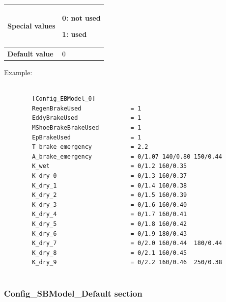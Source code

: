 \begin{itemize}
\begin{longtable}{|l|l|}
			\hline
			
			\begin{minipage}[t]{0.22\linewidth} \textbf{Special values}	\end{minipage}
			&	\begin{minipage}[t]{0.78\linewidth} 0: not used \item 1: used \end{minipage} \\
			
			\hline
			
			\begin{minipage}[t]{0.22\linewidth} \textbf{Default value}	\end{minipage}
			&	\begin{minipage}[t]{0.78\linewidth} 0 \end{minipage} \\
			
			\hline
		\end{longtable}
		
		Example:
		
		\begin{lstlisting}
		
		[Config_EBModel_0]
		RegenBrakeUsed              = 1
		EddyBrakeUsed               = 1
		MShoeBrakeBrakeUsed         = 1
		EpBrakeUsed                 = 1
		T_brake_emergency           = 2.2
		A_brake_emergency           = 0/1.07 140/0.80 150/0.44
		K_wet                       = 0/1.2	160/0.35
		K_dry_0                     = 0/1.3	160/0.37
		K_dry_1                     = 0/1.4	160/0.38
		K_dry_2                     = 0/1.5	160/0.39
		K_dry_3                     = 0/1.6	160/0.40
		K_dry_4                     = 0/1.7	160/0.41
		K_dry_5                     = 0/1.8	160/0.42
		K_dry_6                     = 0/1.9	180/0.43
		K_dry_7                     = 0/2.0	160/0.44  180/0.44
		K_dry_8                     = 0/2.1	160/0.45
		K_dry_9                     = 0/2.2	160/0.46  250/0.38
		
		\end{lstlisting}
	
	\end{itemize}
	
	
\subsubsection{Config\_SBModel\_Default section}
	
